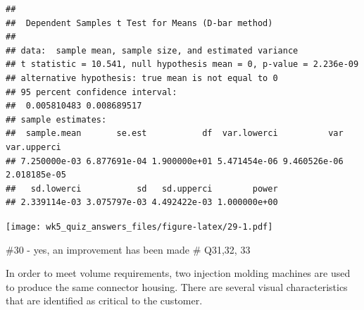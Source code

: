 \documentclass[
]{article}
\newenvironment{Shaded}{\begin{snugshade}}{\end{snugshade}}
\newcommand{\AttributeTok}[1]{\textcolor[rgb]{0.77,0.63,0.00}{#1}}
\newcommand{\CommentTok}[1]{\textcolor[rgb]{0.56,0.35,0.01}{\textit{#1}}}
\newcommand{\DecValTok}[1]{\textcolor[rgb]{0.00,0.00,0.81}{#1}}
\newcommand{\FunctionTok}[1]{\textcolor[rgb]{0.00,0.00,0.00}{#1}}
\newcommand{\NormalTok}[1]{#1}
\newcommand{\OtherTok}[1]{\textcolor[rgb]{0.56,0.35,0.01}{#1}}
\newcommand{\SpecialCharTok}[1]{\textcolor[rgb]{0.00,0.00,0.00}{#1}}
\newcommand{\StringTok}[1]{\textcolor[rgb]{0.31,0.60,0.02}{#1}}
\begin{document}
\begin{verbatim}
## 
##  Dependent Samples t Test for Means (D-bar method)
## 
## data:  sample mean, sample size, and estimated variance
## t statistic = 10.541, null hypothesis mean = 0, p-value = 2.236e-09
## alternative hypothesis: true mean is not equal to 0
## 95 percent confidence interval:
##  0.005810483 0.008689517
## sample estimates:
##  sample.mean       se.est           df  var.lowerci          var  var.upperci 
## 7.250000e-03 6.877691e-04 1.900000e+01 5.471454e-06 9.460526e-06 2.018185e-05 
##   sd.lowerci           sd   sd.upperci        power 
## 2.339114e-03 3.075797e-03 4.492422e-03 1.000000e+00
\end{verbatim}

\begin{Shaded}
\end{Shaded}

\texttt{[image: wk5\_quiz\_answers\_files/figure-latex/29-1.pdf]}

\#30 - yes, an improvement has been made \# Q31,32, 33

In order to meet volume requirements, two injection molding machines are
used to produce the same connector housing. There are several visual
characteristics that are identified as critical to the customer.
\end{document}
